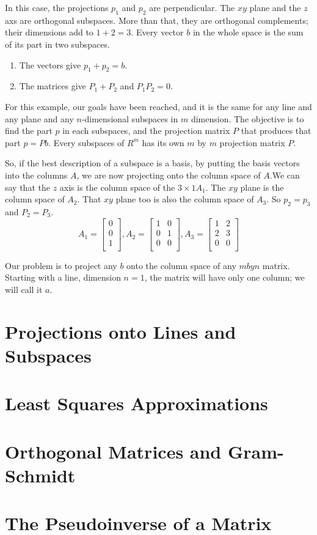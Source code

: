In this case, the projections \(p_1\) and \(p_2\) are perpendicular. The \(xy\) plane and the \(z\) axs are orthogonal subspaces. More than that, they are orthogonal complements; their dimensions add to \(1 + 2 = 3\). Every vector \(b\) in the whole space is the sum of its part in two subspaces. 
\begin{enumerate}
    \item The vectors give \(p_1 + p_2 = b\).
    \item The matrices give \(P_1 + P_2\) and \(P_{1}P_{2}=0\).   
\end{enumerate}

For this example, our goals have been reached, and it is the same for any line and any plane and any \(n\)-dimensional subspaces in \(m\) dimension. The objective is to find the part \(p\) in each subspaces, and the projection matrix \(P\) that produces that part \(p = Pb\). Every subspaces of \(R^m\) has its own \(m\) by \(m\) projection matrix \(P\). 

So, if the best description of a subspace is a basis, by putting the basis vectors into the columns \(A\), we are now projecting onto the column space of \(A\).We can say that the \(z\) axis is the column space of the \(3 \times 1 A_1\). The \(xy\) plane is the column space of \(A_2\). That \(xy\) plane too is also the column space of \(A_3\). So \(p_2 = p_3\) and \(P_2 = P_3\). 
\[
    A_1 = 
    \begin{bmatrix}
         0 \\
         0 \\
         1 \\
    \end{bmatrix}
    , A_2 = 
    \begin{bmatrix}
        1 & 0  \\
        0 & 1  \\
        0 & 0  \\
    \end{bmatrix}
    , A_3 = 
    \begin{bmatrix}
        1 & 2  \\
        2 & 3  \\
        0 & 0 \\
    \end{bmatrix}
\]          

Our problem is to project any \(b\) onto the column space of any \(m by n\) matrix. Starting with a line, dimension \(n = 1\), the matrix will have only one column; we will call it \(a\).    

\section{Projections onto Lines and Subspaces}

\section{Least Squares Approximations}

\section{Orthogonal Matrices and Gram-Schmidt}

\section{The Pseudoinverse of a Matrix}
